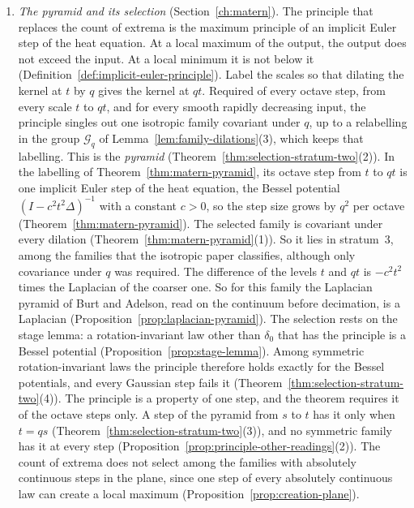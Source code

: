 \begin{enumerate}
\item \emph{The \Matern{} pyramid and its selection} (Section~\ref{ch:matern}). The principle that
replaces the count of extrema is the maximum principle of an implicit Euler step of the heat
equation. At a local maximum of the output, the output does not exceed the input. At a local
minimum it is not below it (Definition~\ref{def:implicit-euler-principle}). Label the scales so that dilating
the kernel at $t$ by $q$ gives the kernel at $qt$. Required of every octave step, from every scale $t$ to $qt$, and for every smooth rapidly decreasing input, the principle singles out
one isotropic family covariant under $q$, up to a relabelling in the group $\mathcal{G}_q$ of
Lemma~\ref{lem:family-dilations}(3), which keeps that labelling. This is the \emph{\Matern{} pyramid}
(Theorem~\ref{thm:selection-stratum-two}(2)). In the labelling of Theorem~\ref{thm:matern-pyramid}, its octave step from $t$ to $qt$ is one implicit Euler
step of the heat equation, the Bessel potential $(I - c^2t^2\Delta)^{-1}$ with a constant $c > 0$,
so the step size grows by $q^2$ per octave (Theorem~\ref{thm:matern-pyramid}). The selected family
is covariant under every dilation (Theorem~\ref{thm:matern-pyramid}(1)). So it lies in stratum~3,
among the families that the isotropic paper classifies, although only covariance under $q$ was
required. The difference of the
levels $t$ and $qt$ is $-c^2t^2$ times the Laplacian of the coarser one. So for this family the
Laplacian pyramid of Burt and Adelson, read on the continuum before decimation, is a Laplacian
(Proposition~\ref{prop:laplacian-pyramid}). The selection rests on the stage lemma: a
rotation-invariant law other than $\delta_0$ that has the principle is a Bessel potential
(Proposition~\ref{prop:stage-lemma}). Among symmetric rotation-invariant laws the principle
therefore holds exactly for the Bessel potentials, and every Gaussian step fails it (Theorem~\ref{thm:selection-stratum-two}(4)). The
principle is a property of one step, and the theorem requires it of the octave steps only. A step
of the \Matern{} pyramid from $s$ to $t$ has it only when $t = qs$
(Theorem~\ref{thm:selection-stratum-two}(3)), and no symmetric family has it at every step
(Proposition~\ref{prop:principle-other-readings}(2)). The count of extrema does not select among the families with
absolutely continuous steps in the plane, since one step of every absolutely continuous law can
create a local maximum
(Proposition~\ref{prop:creation-plane}).


\end{enumerate}

